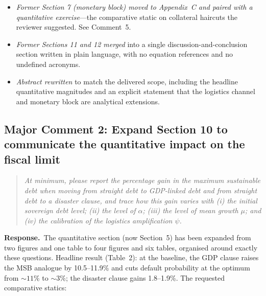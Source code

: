 \documentclass[11pt]{article}
\newcounter{comment}
\newenvironment{revcomment}%
{\refstepcounter{comment}\par\medskip\noindent\begin{quote}\itshape\color{black!70}}%
{\end{quote}\medskip}
\newcommand{\response}{\par\noindent\textbf{Response.}\ }
\begin{document}
\begin{itemize}
\item \emph{Former Section 7 (monetary block) moved to Appendix~C and paired with a quantitative exercise}---the comparative static on collateral haircuts the reviewer suggested. See Comment~5.
\item \emph{Former Sections 11 and 12 merged} into a single discussion-and-conclusion section written in plain language, with no equation references and no undefined acronyms.
\item \emph{Abstract rewritten} to match the delivered scope, including the headline quantitative magnitudes and an explicit statement that the logistics channel and monetary block are analytical extensions.
\end{itemize}

\subsection*{Major Comment 2: Expand Section 10 to communicate the quantitative impact on the fiscal limit}

\begin{revcomment}
At minimum, please report the percentage gain in the maximum sustainable debt when moving from straight debt to GDP-linked debt and from straight debt to a disaster clause, and trace how this gain varies with (i) the initial sovereign debt level; (ii) the level of $\alpha$; (iii) the level of mean growth $\mu$; and (iv) the calibration of the logistics amplification $\psi$.
\end{revcomment}

\response The quantitative section (now Section~5) has been expanded from two figures and one table to four figures and six tables, organised around exactly these questions. Headline result (Table~2): at the baseline, the GDP clause raises the MSB analogue by 10.5--11.9\% and cuts default probability at the optimum from ${\sim}11\%$ to ${\sim}3\%$; the disaster clause gains 1.8--1.9\%. The requested comparative statics:
\end{document}
